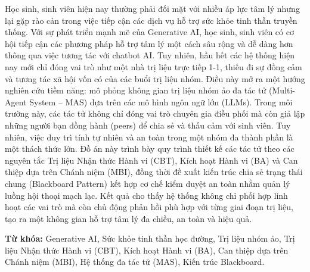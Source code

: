 {\noindent
Học sinh, sinh viên hiện nay thường phải đối mặt với nhiều áp lực tâm lý nhưng lại gặp rào cản trong việc tiếp cận các dịch vụ hỗ trợ sức khỏe tinh thần truyền thống. Với sự phát triển mạnh mẽ của Generative AI, học sinh, sinh viên có cơ hội tiếp cận các phương pháp hỗ trợ tâm lý một cách sâu rộng và dễ dàng hơn thông qua việc tương tác với chatbot AI. Tuy nhiên, hầu hết các hệ thống hiện nay mới chỉ đóng vai trò như một nhà trị liệu trực tiếp 1-1, thiếu đi sự đồng cảm và tương tác xã hội vốn có của các buổi trị liệu nhóm. Điều này mở ra một hướng nghiên cứu tiềm năng: mô phỏng không gian trị liệu nhóm ảo đa tác tử (Multi-Agent System – MAS) dựa trên các mô hình ngôn ngữ lớn (LLMs). Trong môi trường này, các tác tử không chỉ đóng vai trò chuyên gia điều phối mà còn giả lập những người bạn đồng hành (peers) để chia sẻ và thấu cảm với sinh viên. Tuy nhiên, việc duy trì tính tự nhiên và an toàn trong một nhóm đa thành phần là một thách thức lớn. Đồ án này trình bày quy trình thiết kế các tác tử theo các nguyên tắc Trị liệu Nhận thức Hành vi (CBT), Kích hoạt Hành vi (BA) và Can thiệp dựa trên Chánh niệm (MBI), đồng thời đề xuất kiến trúc chia sẻ trạng thái chung (Blackboard Pattern) kết hợp cơ chế kiểm duyệt an toàn nhằm quản lý luồng hội thoại mạch lạc. Kết quả cho thấy hệ thống không chỉ phối hợp linh hoạt các vai trò mà còn chủ động phản hồi phù hợp với từng giai đoạn trị liệu, tạo ra một không gian hỗ trợ tâm lý đa chiều, an toàn và hiệu quả.

\noindent
\textbf{Từ khóa:} Generative AI, Sức khỏe tinh thần học đường, Trị liệu nhóm ảo, Trị liệu Nhận thức Hành vi (CBT), Kích hoạt Hành vi (BA), Can thiệp dựa trên Chánh niệm (MBI), Hệ thống đa tác tử (MAS), Kiến trúc Blackboard.
}
